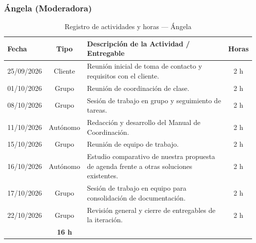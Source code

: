 \subsubsection{Ángela (Moderadora)}
\begin{table}[H]
\centering
\small
{}
\begin{tabularx}{\textwidth}{l c X c}
\toprule
\rowcolor{verdeApagado}
\textbf{\color{textoOscuro}Fecha} & \textbf{\color{textoOscuro}Tipo} & \textbf{\color{textoOscuro}Descripción de la Actividad / Entregable} & \textbf{\color{textoOscuro}Horas} \\
\midrule
25/09/2026 & Cliente & Reunión inicial de toma de contacto y requisitos con el cliente. & 2 h \\
01/10/2026 & Grupo & Reunión de coordinación de clase. & 2 h \\
08/10/2026 & Grupo & Sesión de trabajo en grupo y seguimiento de tareas. & 2 h \\
11/10/2026 & Autónomo & Redacción y desarrollo del Manual de Coordinación. & 2 h \\
15/10/2026 & Grupo & Reunión de equipo de trabajo. & 2 h \\
16/10/2026 & Autónomo & Estudio comparativo de nuestra propuesta de agenda frente a otras soluciones existentes. & 2 h \\
17/10/2026 & Grupo & Sesión de trabajo en equipo para consolidación de documentación. & 2 h \\
22/10/2026 & Grupo & Revisión general y cierre de entregables de la iteración. & 2 h \\
\midrule
\rowcolor{azulclaro!60}
\multicolumn{3}{l}{\textbf{\color{textoOscuro}Total Horas Dedicadas — Ángela:}} & \textbf{\color{textoOscuro}16 h} \\
\bottomrule
\end{tabularx}
\caption{Registro de actividades y horas — Ángela}
\end{table}

